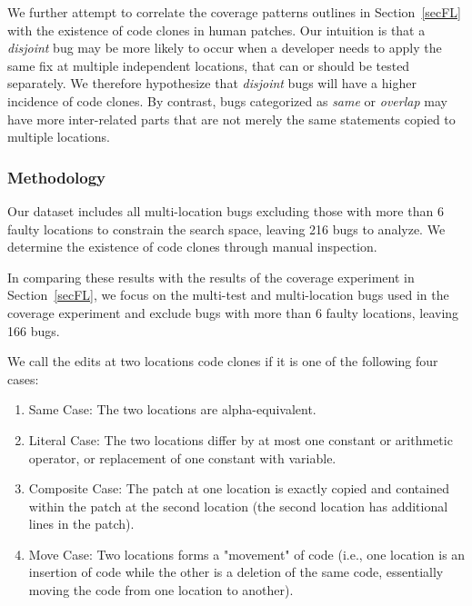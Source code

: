 \documentclass[10pt, conference]{IEEEtran}
\begin{document}
We further attempt to correlate the coverage patterns outlines in
Section~\ref{secFL} with the existence of code clones in human patches.  Our 
intuition is that a \emph{disjoint} bug may be more likely to occur when a
developer needs to apply the same fix at multiple independent locations, that
can or should be tested separately.  We therefore 
 hypothesize that \emph{disjoint} bugs will have a higher incidence of code
clones. By contrast, bugs categorized as \emph{same} or \emph{overlap} may have
more inter-related parts that are not merely the same statements copied to
multiple locations.


\subsubsection{Methodology}
\label{sec52}
Our dataset includes all multi-location bugs excluding those with more than 6 faulty locations to 
constrain the search space, leaving 216 bugs to analyze. We determine the existence of code 
clones through manual inspection.


In comparing these results with the results of the coverage experiment in
Section~\ref{secFL}, we focus on the multi-test and multi-location bugs used in the coverage 
experiment and exclude bugs with more than 6 faulty locations, leaving 166 bugs.

We call the edits at two locations code clones if it is one of the following four cases:
\begin{enumerate}
	\item Same Case: The two locations are alpha-equivalent. 
	\item Literal Case: The two locations differ by at most one constant or arithmetic operator,
	or replacement of one constant with variable.
	\item Composite Case: The patch at one location is exactly copied and contained within the patch at 
	the 
	second location (the second location  has additional lines in the patch).
	\item Move Case: Two locations forms a "movement" of code (i.e., one location is an insertion of 
	code 
	while the other is a deletion of the same code, essentially moving the code from one location to 
	another).
\end{enumerate}
\end{document}
